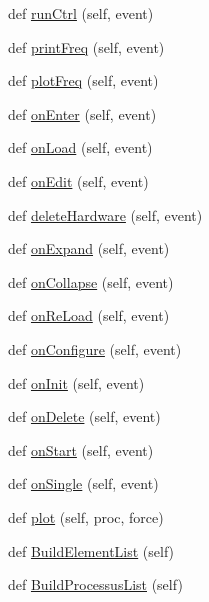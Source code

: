 \begin{DoxyCompactItemize}
def \hyperlink{classAppFrame_1_1AppFrame_ab58d0d5681ba072d05d5a1675aafb4a8}{run\+Ctrl} (self, event)
\item 
def \hyperlink{classAppFrame_1_1AppFrame_a0d84b5e77982e10cf04c5c01b89f2f79}{print\+Freq} (self, event)
\item 
def \hyperlink{classAppFrame_1_1AppFrame_a187376839e96a776ba48f2e294ee96f4}{plot\+Freq} (self, event)
\item 
def \hyperlink{classAppFrame_1_1AppFrame_a6d45e9371b9574920fbbaff0846cb3a6}{on\+Enter} (self, event)
\item 
def \hyperlink{classAppFrame_1_1AppFrame_a3a44fde65be4ba4bd5a92f4e85a29772}{on\+Load} (self, event)
\item 
def \hyperlink{classAppFrame_1_1AppFrame_ae6524f7daa824546661b4824a2ae7606}{on\+Edit} (self, event)
\item 
def \hyperlink{classAppFrame_1_1AppFrame_a66c7d8bd4f702f36aa230cb54f47e7e8}{delete\+Hardware} (self, event)
\item 
def \hyperlink{classAppFrame_1_1AppFrame_a3edd90a5c52b1be8d12d3536c800f0c9}{on\+Expand} (self, event)
\item 
def \hyperlink{classAppFrame_1_1AppFrame_a7e972158ea6bfcb0ede937b37079b4c7}{on\+Collapse} (self, event)
\item 
def \hyperlink{classAppFrame_1_1AppFrame_a9ff1f12856ce454896ae7c965eef2ba3}{on\+Re\+Load} (self, event)
\item 
def \hyperlink{classAppFrame_1_1AppFrame_a42b5e1947e8d7ef528d158a15a8b081d}{on\+Configure} (self, event)
\item 
def \hyperlink{classAppFrame_1_1AppFrame_a3b9d3eb6615829d42754d51b4d82f300}{on\+Init} (self, event)
\item 
def \hyperlink{classAppFrame_1_1AppFrame_a55868f842496adbc598ea5a8e03a8a03}{on\+Delete} (self, event)
\item 
def \hyperlink{classAppFrame_1_1AppFrame_a9816dbc13e8b6c54d11532e2bf53eb86}{on\+Start} (self, event)
\item 
def \hyperlink{classAppFrame_1_1AppFrame_ad84cc70dd583d651f0b8eded860340a8}{on\+Single} (self, event)
\item 
def \hyperlink{classAppFrame_1_1AppFrame_a447c97fade589311c9e60e66c1ce795c}{plot} (self, proc, force)
\item 
def \hyperlink{classAppFrame_1_1AppFrame_a90f00924adb754f9e2cee4a658e3e5e9}{Build\+Element\+List} (self)
\item 
def \hyperlink{classAppFrame_1_1AppFrame_a56984a1e8d83849a66965ec5cb99e6e7}{Build\+Processus\+List} (self)

\end{DoxyCompactItemize}
